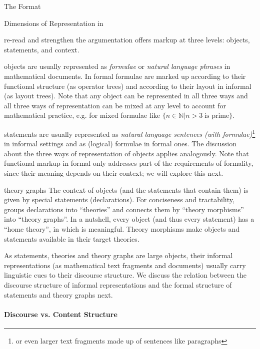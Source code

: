 \begin{omgroup}[creators=miko,id=spec-intro]{The \omdoc Format}
\begin{omgroup}[id=syntax-semantics]{Dimensions of Representation in \omdoc}
\begin{newpart}{re-read and strengthen the argumentation}
\omdoc offers markup at three levels: objects, statements, and context.
\begin{compactdesc}
\item[objects] are usually represented as {\emph{formulae}} or \emph{natural language
    phrases} in mathematical documents. In formal \omdoc formulae are marked up according
  to their functional structure (as operator trees) and according to their layout in
  informal \omdoc (as layout trees). Note that any object can be represented in all three
  ways and all three ways of representation can be mixed at any level to account for
  mathematical practice, e.g. for mixed formulae like $\{n\in\mathbb{N}\bigl|n>3 \;\text{
    is prime}\}$.
\item[statements] are usually represented as \emph{natural language sentences (with
    formulae)}\footnote{or even larger text fragments made up of sentences like
    paragraphs} in informal settings and as (logical) formulae in formal ones. The
  discussion about the three ways of representation of objects applies analogously. Note
  that functional markup in formal \omdoc only addresses part of the requirements of
  formality, since their meaning depends on their context; we will explore this next.
\item[theory graphs] The context of objects (and the statements that contain
  them) is given by special statements (declarations). For conciseness and tractability,
  \omdoc groups declarations into ``theories'' and connects them by ``theory morphisms''
  into ``theory graphs''. In a nutshell, every object (and thus every statement) has a
  ``home theory'', in which is meaningful. Theory morphisms make objects and statements
  available in their target theories. 
\end{compactdesc}
As statements, theories and theory graphs are large objects, their informal
representations (as mathematical text fragments and documents) usually carry linguistic
cues to their discourse structure. We discuss
the relation between the discourse structure of informal representations and the formal
structure of statements and theory graphs next.

\paragraph{Discourse vs. Content Structure}


\end{newpart}
\end{omgroup}
\end{omgroup}
